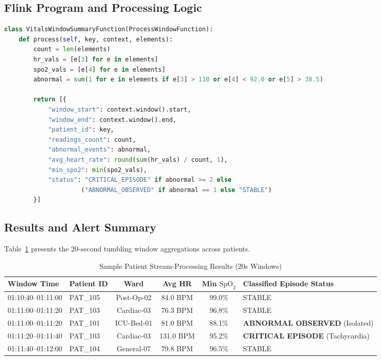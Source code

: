 \documentclass[12pt,a4paper]{report}
\begin{document}
\subsection{Flink Program and Processing Logic}
\begin{lstlisting}[language=Python, caption={PyFlink Window Summary Function}]
class VitalsWindowSummaryFunction(ProcessWindowFunction):
    def process(self, key, context, elements):
        count = len(elements)
        hr_vals = [e[3] for e in elements]
        spo2_vals = [e[4] for e in elements]
        abnormal = sum(1 for e in elements if e[3] > 110 or e[4] < 92.0 or e[5] > 38.5)

        return [{
            "window_start": context.window().start,
            "window_end": context.window().end,
            "patient_id": key,
            "readings_count": count,
            "abnormal_events": abnormal,
            "avg_heart_rate": round(sum(hr_vals) / count, 1),
            "min_spo2": min(spo2_vals),
            "status": "CRITICAL_EPISODE" if abnormal >= 2 else 
                     ("ABNORMAL_OBSERVED" if abnormal == 1 else "STABLE")
        }]
\end{lstlisting}

\subsection{Results and Alert Summary}
Table~\ref{tab:flink_results} presents the 20-second tumbling window aggregations across patients.

\begin{table}[H]
\centering
\caption{Sample Patient Stream-Processing Results (20s Windows)}
\label{tab:flink_results}
\begin{tabularx}{\textwidth}{|l|l|c|c|c|X|}
\hline
\textbf{Window Time} & \textbf{Patient ID} & \textbf{Ward} & \textbf{Avg HR} & \textbf{Min $\text{SpO}_2$} & \textbf{Classified Episode Status}\\
\hline
01:10:40--01:11:00 & PAT\_105 & Post-Op-02 & 84.0 BPM & 99.0\% & STABLE\\
\hline
01:11:00--01:11:20 & PAT\_103 & Cardiac-03 & 76.3 BPM & 96.8\% & STABLE\\
\hline
01:11:00--01:11:20 & PAT\_101 & ICU-Bed-01 & 81.0 BPM & 88.1\% & \textbf{ABNORMAL OBSERVED} (Isolated)\\
\hline
01:11:20--01:11:40 & PAT\_103 & Cardiac-03 & 131.0 BPM & 95.2\% & \textbf{CRITICAL EPISODE} (Tachycardia)\\
\hline
01:11:40--01:12:00 & PAT\_104 & General-07 & 79.8 BPM & 96.5\% & STABLE\\
\hline
\end{tabularx}
\end{table}
\end{document}
